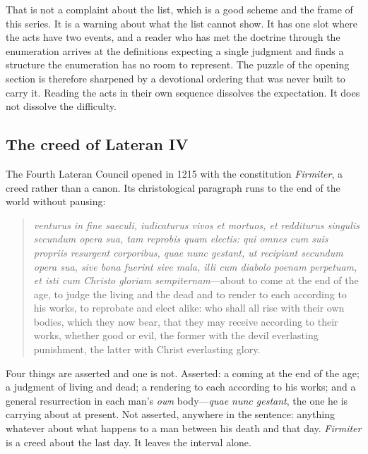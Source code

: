 That is not a complaint about the list, which is a good scheme and the frame of this series. It is a warning about what the list cannot show. It has one slot where the acts have two events, and a reader who has met the doctrine through the enumeration arrives at the definitions expecting a single judgment and finds a structure the enumeration has no room to represent. The puzzle of the opening section is therefore sharpened by a devotional ordering that was never built to carry it. Reading the acts in their own sequence dissolves the expectation. It does not dissolve the difficulty.

\subsection{The creed of Lateran IV}

The Fourth Lateran Council opened in 1215 with the constitution \emph{Firmiter}, a creed rather than a canon. Its christological paragraph runs to the end of the world without pausing:

\begin{quote}
\emph{venturus in fine saeculi, iudicaturus vivos et mortuos, et redditurus singulis secundum opera sua, tam reprobis quam electis: qui omnes cum suis propriis resurgent corporibus, quae nunc gestant, ut recipiant secundum opera sua, sive bona fuerint sive mala, illi cum diabolo poenam perpetuam, et isti cum Christo gloriam sempiternam}---about to come at the end of the age, to judge the living and the dead and to render to each according to his works, to reprobate and elect alike: who shall all rise with their own bodies, which they now bear, that they may receive according to their works, whether good or evil, the former with the devil everlasting punishment, the latter with Christ everlasting glory.
\end{quote}

Four things are asserted and one is not. Asserted: a coming at the end of the age; a judgment of living and dead; a rendering to each according to his works; and a general resurrection in each man's \emph{own} body---\emph{quae nunc gestant}, the one he is carrying about at present. Not asserted, anywhere in the sentence: anything whatever about what happens to a man between his death and that day. \emph{Firmiter} is a creed about the last day. It leaves the interval alone.

